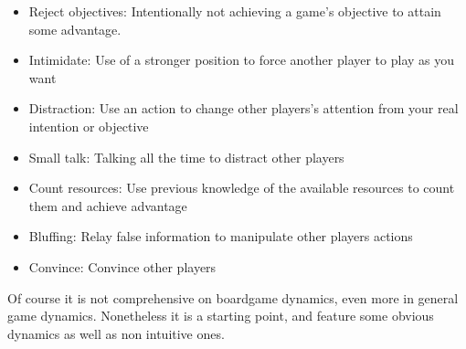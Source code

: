 \begin{multicols}{2}
\begin{itemize}
    \item Reject objectives: Intentionally not achieving a game's objective to attain some advantage.
    \item Intimidate: Use of a stronger position to force another player to play as you want
    \item Distraction: Use an action to change other players's attention from your real intention or objective
    \item Small talk: Talking all the time to distract other players
    \item Count resources: Use previous knowledge of the available resources to count them and achieve advantage
    \item Bluffing: Relay false information to manipulate other players actions
    \item Convince: Convince other players
\end{itemize}
\end{multicols}
Of course it is not comprehensive on boardgame dynamics, even more in general game dynamics. Nonetheless it is a starting point, and feature some obvious dynamics as well as non intuitive ones.
